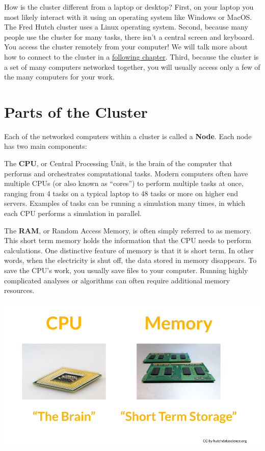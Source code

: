 \documentclass[
]{book}
\begin{document}
How is the cluster different from a laptop or desktop? First, on your laptop you most likely interact with it using an operating system like Windows or MacOS. The Fred Hutch cluster uses a Linux operating system. Second, because many people use the cluster for many tasks, there isn't a central screen and keyboard. You access the cluster remotely from your computer! We will talk more about how to connect to the cluster in a \protect\hyperlink{terminal}{following chapter}. Third, because the cluster is a set of many computers networked together, you will usually access only a few of the many computers for your work.

\hypertarget{parts-of-the-cluster}{%
\section{Parts of the Cluster}\label{parts-of-the-cluster}}

Each of the networked computers within a cluster is called a \textbf{Node}. Each node has two main components:

The \textbf{CPU}, or Central Processing Unit, is the brain of the computer that performs and orchestrates computational tasks. Modern computers often have multiple CPUs (or also known as ``cores'') to perform multiple tasks at once, ranging from 4 tasks on a typical laptop to 48 tasks or more on higher end servers. Examples of tasks can be running a simulation many times, in which each CPU performs a simulation in parallel.

The \textbf{RAM}, or Random Access Memory, is often simply referred to as memory. This short term memory holds the information that the CPU needs to perform calculations. One distinctive feature of memory is that it is short term. In other words, when the electricity is shut off, the data stored in memory disappears. To save the CPU's work, you usually save files to your computer. Running highly complicated analyses or algorithms can often require additional memory resources.

\begin{center}\includegraphics[width=0.8\linewidth]{resources/images/01-cluster_files/figure-latex//1BQxrVYdKZTbpCaF-i_q9w7s9x034lEXpQZDU-Sl09cs_gff2211b72f_1_26} \end{center}
\end{document}
